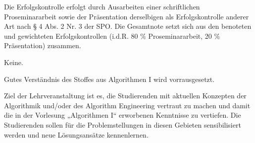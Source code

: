 \begin{course}

\setdoclanguagegerman
{}



\coursehead


\label{cour_14479.dp_997}


\begin{styleenv}
\begin{assessment}
Die Erfolgskontrolle erfolgt durch Ausarbeiten einer schriftlichen Proseminararbeit sowie der Präsentation derselbigen als Erfolgskontrolle anderer Art nach § 4 Abs. 2 Nr. 3 der SPO. Die Gesamtnote setzt sich aus den benoteten und gewichteten Erfolgskontrollen (i.d.R. 80 \% Proseminararbeit, 20 \% Präsentation) zusammen.


\end{assessment}

\begin{conditions}Keine.\end{conditions}

\begin{recommendations}Gutes Verständnis des Stoffes aus Algorithmen I wird vorrausgesetzt.

\end{recommendations}
\end{styleenv}

\begin{learningoutcomes}
Ziel der Lehrveranstaltung ist es, die Studierenden mit aktuellen Konzepten der Algorithmik und/oder des Algorithm Engineering vertraut zu machen und damit die in der Vorlesung „Algorithmen I“ erworbenen Kenntnisse zu vertiefen. Die Studierenden sollen für die Problemstellungen in diesen Gebieten sensibilisiert werden und neue Lösungsansätze kennenlernen.

 


\end{learningoutcomes}
\end{course}
